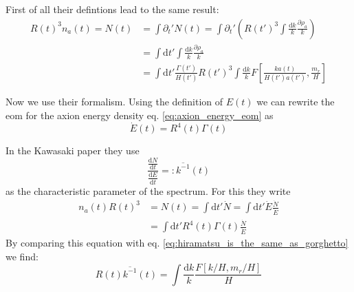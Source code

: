 \documentclass[a4paper]{article}
\begin{document}
First of all their defintions lead to the same result:
\begin{align}
	\label{eq:hiramatsu_is_the_same_as_gorghetto}
	R(t)^3 n_a(t) = N(t) &= \int \partial_t' N(t) = \int \partial_t' \left( R(t')^3 \int \frac{\mathrm{d} k}{k} \frac{\partial \rho_a}{k} \right) \\
	&= \int \mathrm{d} t' \int \frac{\mathrm{d} k}{k} \frac{\partial \rho_a}{k} \\
	&= \int \mathrm{d} t' \frac{\Gamma(t')}{H(t')} R(t')^3 \int \frac{\mathrm{d} k}{k} F\left[\frac{ka(t)}{H(t')a(t')}, \frac{m_r}{H}\right]
\end{align}

Now we use their formalism.
Using the definition of $E(t)$ we can rewrite the eom for the axion energy density eq. \eqref{eq:axion_energy_eom} as 
\begin{equation}
	\dot{E}(t) = R^4(t) \Gamma(t)
\end{equation}

In the Kawasaki paper \cite{improved_estimation_hiramatsu} they use 
\begin{equation}
	\frac{\frac{\mathrm{d} N}{\mathrm{d} t}}{\frac{\mathrm{d} E}{\mathrm{d} t}} =: \overline{k^{-1}}(t)
\end{equation}
as the characteristic parameter of the spectrum.
For this they write 
\begin{align}
	n_a(t) R(t)^3 &= N(t) = \int \mathrm{d} t' \dot{N} = \int \mathrm{d} t' \dot{E} \frac{\dot{N}}{\dot{E}} \\
	&= \int \mathrm{d} t' R^4(t) \Gamma(t) \frac{\dot{N}}{\dot{E}}
\end{align}
By comparing this equation with eq. \eqref{eq:hiramatsu_is_the_same_as_gorghetto} we find:
\begin{equation}
	R(t) \overline{k^{-1}}(t) = \int \frac{\mathrm{d} k}{k} \frac{F[k/H, m_r/H]}{H}
\end{equation}
\end{document}

